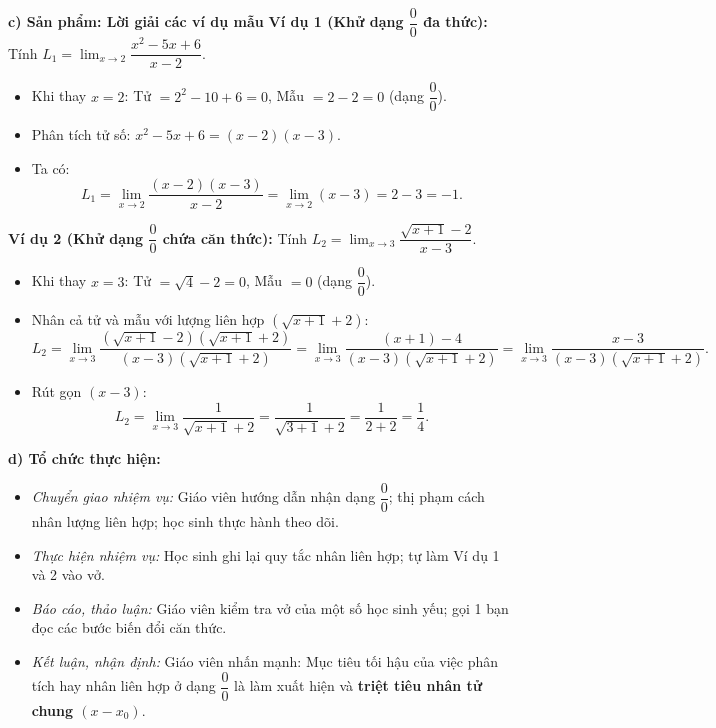 \documentclass[12pt, a4paper]{article}
\begin{document}
\noindent \textbf{c) Sản phẩm: Lời giải các ví dụ mẫu}
\textbf{Ví dụ 1 (Khử dạng $\dfrac{0}{0}$ đa thức):} Tính $L_1 = \lim_{x \to 2} \dfrac{x^2 - 5x + 6}{x - 2}$.
\begin{itemize}[leftmargin=0.6cm]
    \item Khi thay $x = 2$: Tử $= 2^2 - 10 + 6 = 0$, Mẫu $= 2 - 2 = 0$ (dạng $\dfrac{0}{0}$).
    \item Phân tích tử số: $x^2 - 5x + 6 = (x - 2)(x - 3)$.
    \item Ta có:
    $$L_1 = \lim_{x \to 2} \dfrac{(x - 2)(x - 3)}{x - 2} = \lim_{x \to 2} (x - 3) = 2 - 3 = -1.$$
\end{itemize}

\textbf{Ví dụ 2 (Khử dạng $\dfrac{0}{0}$ chứa căn thức):} Tính $L_2 = \lim_{x \to 3} \dfrac{\sqrt{x + 1} - 2}{x - 3}$.
\begin{itemize}[leftmargin=0.6cm]
    \item Khi thay $x = 3$: Tử $= \sqrt{4} - 2 = 0$, Mẫu $= 0$ (dạng $\dfrac{0}{0}$).
    \item Nhân cả tử và mẫu với lượng liên hợp $(\sqrt{x + 1} + 2)$:
    $$L_2 = \lim_{x \to 3} \dfrac{(\sqrt{x + 1} - 2)(\sqrt{x + 1} + 2)}{(x - 3)(\sqrt{x + 1} + 2)} = \lim_{x \to 3} \dfrac{(x + 1) - 4}{(x - 3)(\sqrt{x + 1} + 2)} = \lim_{x \to 3} \dfrac{x - 3}{(x - 3)(\sqrt{x + 1} + 2)}.$$
    \item Rút gọn $(x - 3)$:
    $$L_2 = \lim_{x \to 3} \dfrac{1}{\sqrt{x + 1} + 2} = \dfrac{1}{\sqrt{3 + 1} + 2} = \dfrac{1}{2 + 2} = \dfrac{1}{4}.$$
\end{itemize}

\noindent \textbf{d) Tổ chức thực hiện:}
\begin{itemize}[leftmargin=0.8cm]
    \item \textit{Chuyển giao nhiệm vụ:} Giáo viên hướng dẫn nhận dạng $\dfrac{0}{0}$; thị phạm cách nhân lượng liên hợp; học sinh thực hành theo dõi.
    \item \textit{Thực hiện nhiệm vụ:} Học sinh ghi lại quy tắc nhân liên hợp; tự làm Ví dụ 1 và 2 vào vở.
    \item \textit{Báo cáo, thảo luận:} Giáo viên kiểm tra vở của một số học sinh yếu; gọi 1 bạn đọc các bước biến đổi căn thức.
    \item \textit{Kết luận, nhận định:} Giáo viên nhấn mạnh: Mục tiêu tối hậu của việc phân tích hay nhân liên hợp ở dạng $\dfrac{0}{0}$ là làm xuất hiện và \textbf{triệt tiêu nhân tử chung $(x - x_0)$}.
\end{itemize}
\end{document}
